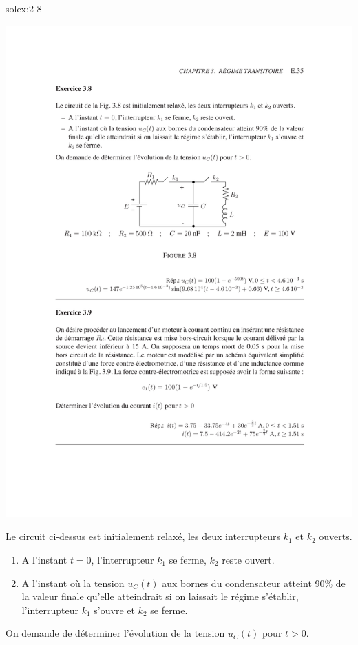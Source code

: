 \begin{exwithsol}{solex:2-8}
	\label{ex:2-8}
\begin{center}
	\includegraphics[width=0.95\linewidth]{exercices/ex-3-8}
\end{center}
Le circuit ci-dessus est initialement relax\'e, les deux
interrupteurs $k_1$ et $k_2$ ouverts. 
\begin{enumerate}
	\item A l'instant $t=0$, l'interrupteur $k_1$ se ferme, $k_2$ reste
	ouvert.
	\item A l'instant o\`u la tension $u_C(t)$ aux bornes du condensateur
	atteint 90\% de la valeur finale qu'elle atteindrait si on laissait
	le r\'egime s'\'etablir, l'interrupteur $k_1$ s'ouvre et $k_2$ se ferme.
\end{enumerate}
On demande de d\'eterminer l'\'evolution de la tension $u_C(t)$ pour $t>0$.

\end{exwithsol}

